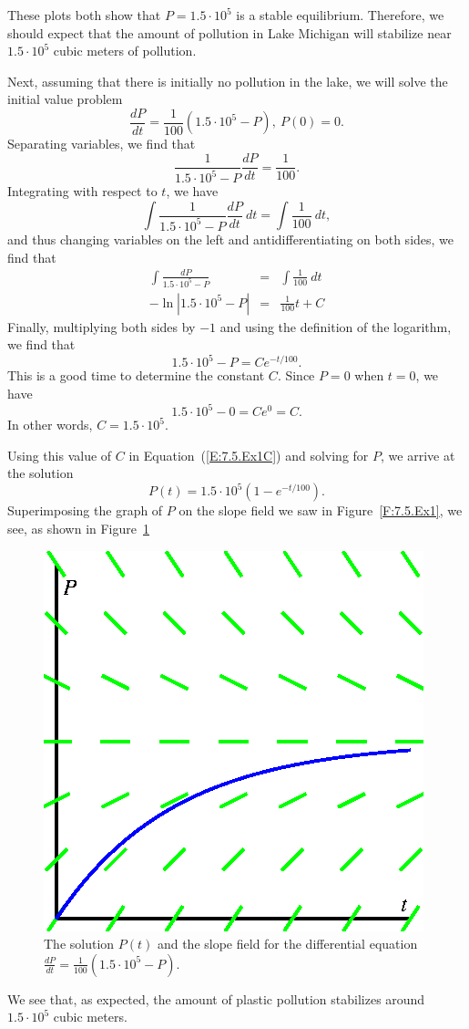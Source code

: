These plots both show that $P=1.5\cdot10^5$ is a stable equilibrium.  Therefore,
we should expect that the amount of pollution in Lake Michigan will
stabilize near $1.5\cdot10^5$ cubic meters of pollution.

Next, assuming that there is initially no pollution in the lake, we will
solve the initial value problem
$$
\frac{dP}{dt} = \frac{1}{100}(1.5\cdot10^{5} - P), \ P(0) = 0.
$$
Separating variables, we find that
$$
\frac1{1.5\cdot10^5-P} \frac{dP}{dt} = \frac1{100}.
$$
Integrating with respect to $t$, we have 
$$  \int \frac1{1.5\cdot10^5-P} \frac{dP}{dt}~dt = \int \frac1{100}~dt,$$
and thus changing variables on the left and antidifferentiating on both sides, we find that
\begin{eqnarray*}
  \int \frac{dP}{1.5\cdot10^5-P} &=& \int \frac1{100}~dt \\
  -\ln|1.5\cdot10^5 - P| & = & \frac1{100}t + C
\end{eqnarray*}
Finally, multiplying both sides by $-1$ and using the definition of the logarithm, we find that
\begin{equation} \label{E:7.5.Ex1C}  1.5\cdot10^5 - P = C e^{-t/100}.
\end{equation}
This is a good time to determine the constant $C$.  Since $P =
0$ when $t=0$, we have
$$
1.5\cdot 10^5 - 0 = Ce^0 = C.
$$
In other words, $C=1.5\cdot10^5$. 

Using this value of $C$ in Equation~(\ref{E:7.5.Ex1C}) and solving for $P$, we arrive at the solution
$$ P(t) = 1.5\cdot10^5(1-e^{-t/100}).$$
Superimposing the graph of $P$ on the slope field we saw in Figure~\ref{F:7.5.Ex1}, we see, as shown in Figure~\ref{F:7.5.Ex1a}
\begin{figure}[h]
\begin{center}
  \includegraphics{figures/7_5_solution.eps}
\caption{The solution $P(t)$ and the slope field for the differential equation $\frac{dP}{dt} = \frac{1}{100}(1.5\cdot10^{5} - P)$.} \label{F:7.5.Ex1a}
\end{center}
\end{figure}
We see that, as expected, the amount of plastic pollution stabilizes around
$1.5\cdot10^5$ cubic meters.

